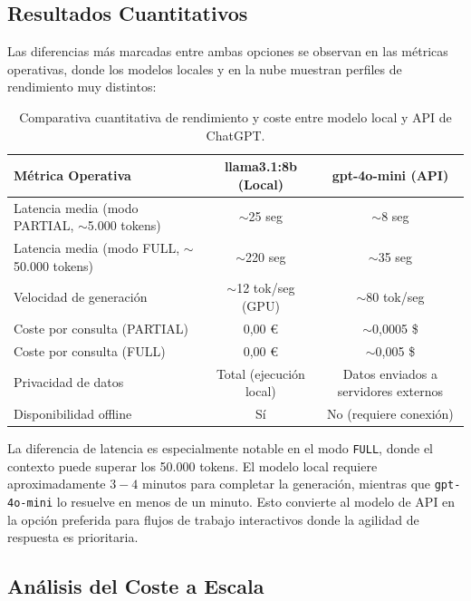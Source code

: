 \subsection{Resultados Cuantitativos}

Las diferencias más marcadas entre ambas opciones se observan en las métricas operativas, donde los modelos locales y en la nube muestran perfiles de rendimiento muy distintos:

\begin{table}[ht]
\centering
\renewcommand{\arraystretch}{1.3}
\caption{Comparativa cuantitativa de rendimiento y coste entre modelo local y API de ChatGPT.}
\label{tab:comparativa_cuantitativa}
\begin{tabularx}{\textwidth}{|X|c|c|}
\hline
\textbf{Métrica Operativa} & \textbf{llama3.1:8b (Local)} & \textbf{gpt-4o-mini (API)} \\ \hline
Latencia media (modo PARTIAL, $\sim$5.000 tokens) & $\sim$25 seg & $\sim$8 seg \\ \hline
Latencia media (modo FULL, $\sim$50.000 tokens) & $\sim$220 seg & $\sim$35 seg \\ \hline
Velocidad de generación & $\sim$12 tok/seg (GPU) & $\sim$80 tok/seg \\ \hline
Coste por consulta (PARTIAL) & 0,00 \euro{} & $\sim$0,0005 \$ \\ \hline
Coste por consulta (FULL) & 0,00 \euro{} & $\sim$0,005 \$ \\ \hline
Privacidad de datos & Total (ejecución local) & Datos enviados a servidores externos \\ \hline
Disponibilidad offline & Sí & No (requiere conexión) \\ \hline
\end{tabularx}
\end{table}

La diferencia de latencia es especialmente notable en el modo \texttt{FULL}, donde el contexto puede superar los 50.000 tokens. El modelo local requiere aproximadamente $3{-}4$ minutos para completar la generación, mientras que \texttt{gpt-4o-mini} lo resuelve en menos de un minuto. Esto convierte al modelo de API en la opción preferida para flujos de trabajo interactivos donde la agilidad de respuesta es prioritaria.

\subsection{Análisis del Coste a Escala}

